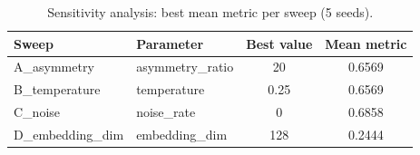 \begin{table}[t]
\centering
\caption{Sensitivity analysis: best mean metric per sweep (5 seeds).}
\label{tab:exp4}
\begin{tabular}{llcc}
\toprule
Sweep & Parameter & Best value & Mean metric \\
\midrule
A\_asymmetry & asymmetry\_ratio & 20 & 0.6569 \\
B\_temperature & temperature & 0.25 & 0.6569 \\
C\_noise & noise\_rate & 0 & 0.6858 \\
D\_embedding\_dim & embedding\_dim & 128 & 0.2444 \\
\bottomrule
\end{tabular}
\end{table}
